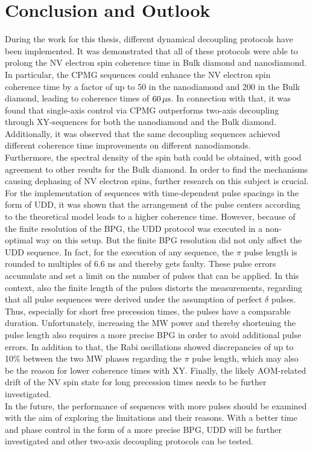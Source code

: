 \documentclass[12pt,a4paper]{article}
\begin{document}
\section{Conclusion and Outlook}
During the work for this thesis, different dynamical decoupling protocols have been implemented. It was demonstrated that all of these protocols were able to prolong the NV electron spin coherence time in Bulk diamond and nanodiamond. In particular, the CPMG sequences could enhance the NV electron spin coherence time by a factor of up to 50 in the nanodiamond and 200 in the Bulk diamond, leading to coherence times of $\unit[60]{\mu s}$. In connection with that, it was found that single-axis control via CPMG outperforms two-axis decoupling through XY-sequences for both the nanodiamond and the Bulk diamond. Additionally, it was observed that the same decoupling sequences achieved different coherence time improvements on different nanodiamonds.
\\
Furthermore, the spectral density of the spin bath could be obtained, with good agreement to other results for the Bulk diamond. In order to find the mechanisms causing dephasing of NV electron spins, further research on this subject is crucial.
\\
For the implementation of sequences with time-dependent pulse spacings in the form of UDD, it was shown that the arrangement of the pulse centers according to the theoretical model leads to a higher coherence time. However, because of the finite resolution of the BPG, the UDD protocol was executed in a non-optimal way on this setup. But the finite BPG resolution did not only affect the UDD sequence. In fact, for the execution of any sequence, the $\pi$ pulse length is rounded to multiples of 6.6 ns and thereby gets faulty. These pulse errors accumulate\cite{pea} and set a limit on the number of pulses that can be applied. In this context, also the finite length of the pulses distorts the measurements, regarding that all pulse sequences were derived under the assumption of perfect $\delta$ pulses. Thus, especially for short free precession times, the pulses have a comparable duration. Unfortunately, increasing the MW power and thereby shortening the pulse length also requires a more precise BPG in order to avoid additional pulse errors. In addition to that, the Rabi oscillations 
showed discrepancies of up to 10\% between the two MW phases regarding the $\pi$ pulse length, which may also be the reason for lower coherence times with XY. Finally, the likely AOM-related drift of the NV spin state for long precession times needs to be further investigated.\\
In the future, the performance of sequences with more pulses should be examined with the aim of exploring the limitations and their reasons. With a better time and phase control in the form of a more precise BPG, UDD will be further investigated and other two-axis decoupling protocols\cite{qdd} can be tested. 






\end{document}
